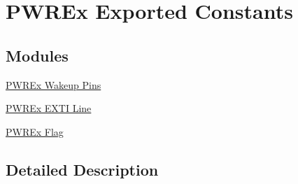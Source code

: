 \hypertarget{group___p_w_r_ex___exported___constants}{}\section{P\+W\+R\+Ex Exported Constants}
\label{group___p_w_r_ex___exported___constants}
\subsection*{Modules}
\begin{DoxyCompactItemize}
\item 
\hyperlink{group___p_w_r_ex___wake_up___pins}{P\+W\+R\+Ex Wakeup Pins}
\item 
\hyperlink{group___p_w_r_ex___e_x_t_i___line}{P\+W\+R\+Ex E\+X\+T\+I Line}
\item 
\hyperlink{group___p_w_r_ex___flag}{P\+W\+R\+Ex Flag}
\end{DoxyCompactItemize}


\subsection{Detailed Description}
